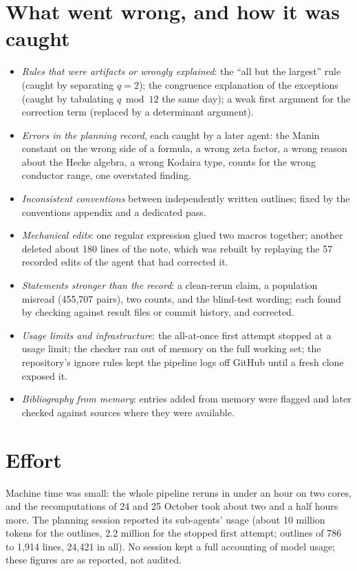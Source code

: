 \documentclass[11pt,a4paper]{article}
\begin{document}
\section{What went wrong, and how it was caught}
\begin{itemize}
\item \emph{Rules that were artifacts or wrongly explained}: the ``all but the largest'' rule (caught by separating $q=2$); the congruence explanation of the exceptions (caught by tabulating $q\bmod12$ the same day); a weak first argument for the correction term (replaced by a determinant argument).
\item \emph{Errors in the planning record}, each caught by a later agent: the Manin constant on the wrong side of a formula, a wrong zeta factor, a wrong reason about the Hecke algebra, a wrong Kodaira type, counts for the wrong conductor range, one overstated finding.
\item \emph{Inconsistent conventions} between independently written outlines; fixed by the conventions appendix and a dedicated pass.
\item \emph{Mechanical edits}: one regular expression glued two macros together; another deleted about 180 lines of the note, which was rebuilt by replaying the 57 recorded edits of the agent that had corrected it.
\item \emph{Statements stronger than the record}: a clean-rerun claim, a population misread (455,707 pairs), two counts, and the blind-test wording; each found by checking against result files or commit history, and corrected.
\item \emph{Usage limits and infrastructure}: the all-at-once first attempt stopped at a usage limit; the checker ran out of memory on the full working set; the repository's ignore rules kept the pipeline logs off GitHub until a fresh clone exposed it.
\item \emph{Bibliography from memory}: entries added from memory were flagged and later checked against sources where they were available.
\end{itemize}

\section{Effort}
Machine time was small: the whole pipeline reruns in under an hour on two cores, and the recomputations of 24 and 25 October took about two and a half hours more. The planning session reported its sub-agents' usage (about 10 million tokens for the outlines, 2.2 million for the stopped first attempt; outlines of 786 to 1,914 lines, 24,421 in all). No session kept a full accounting of model usage; these figures are as reported, not audited.
\end{document}
